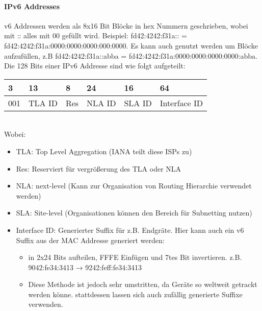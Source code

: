         \paragraph{IPv6 Addresses}
            v6 Addressen werden als 8x16 Bit Blöcke in hex Nummern geschrieben, wobei mit :: alles mit 00 gefüllt wird. Beispiel: fd42:4242:f31a:: = fd42:4242:f31a:0000:0000:0000:000:0000. Es kann auch genutzt werden um Blöcke aufzufüllen, z.B fd42:4242:f31a::abba = fd42:4242:f31a:0000:0000:0000:0000:abba. Die 128 Bits einer IPv6 Addresse sind wie folgt aufgeteilt:
            \begin{table}[h]
                \centering
                \begin{tabular}{llllll}
                3 &
                  13 &
                  8 &
                  24 &
                  16 &
                  64 \\ \hline
                \multicolumn{1}{|l|}{001} &
                  \multicolumn{1}{l|}{TLA ID} &
                  \multicolumn{1}{l|}{Res} &
                  \multicolumn{1}{l|}{NLA ID} &
                  \multicolumn{1}{l|}{SLA ID} &
                  \multicolumn{1}{l|}{Interface ID} \\ \hline
                \end{tabular}
            \end{table} \\ 
            Wobei:
            \begin{itemize}
                \item TLA: Top Level Aggregation (IANA teilt diese ISPs zu)
                \item Res: Reserviert für vergrößerung des TLA oder NLA
                \item NLA: next-level (Kann zur Organisation von Routing Hierarchie verwendet werden)
                \item SLA: Site-level (Organisationen können den Bereich für Subnetting nutzen)
                \item Interface ID: Generierter Suffix für z.B. Endgräte. Hier kann auch ein v6 Suffix aus der MAC Addresse generiert werden: 
                \begin{itemize}
                    \item in 2x24 Bits aufteilen, FFFE Einfügen und 7tes Bit invertieren. z.B. 9042:fe34:3413 → 9242:feff:fe34:3413
                    \item Diese Methode ist jedoch sehr umstritten, da Geräte so weltweit getrackt werden könne. stattdessen lassen sich auch zufällig generierte Suffixe verwenden.
                \end{itemize} 
            \end{itemize}

